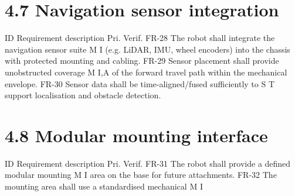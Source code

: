 \section*{4.7 Navigation sensor integration}

ID          Requirement description                                        Pri.         Verif. FR-28       The robot shall integrate the navigation sensor suite           M              I (e.g. LiDAR, IMU, wheel encoders) into the chassis with protected mounting and cabling. FR-29       Sensor placement shall provide unobstructed coverage            M            I,A of the forward travel path within the mechanical envelope. FR-30       Sensor data shall be time-aligned/fused sufficiently to          S            T support localisation and obstacle detection.

\section*{4.8 Modular mounting interface}

ID          Requirement description                                        Pri.         Verif. FR-31       The robot shall provide a defined modular mounting              M              I area on the base for future attachments. FR-32       The mounting area shall use a standardised mechanical           M              I

